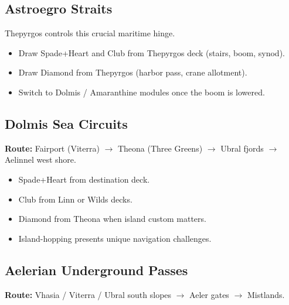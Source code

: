 \subsection{Astroegro Straits}\label{subsec:astroegro_straits}

Thepyrgos controls this crucial maritime hinge.

\begin{itemize}
    \item Draw Spade+Heart and Club from Thepyrgos deck (stairs, boom, synod).
    \item Draw Diamond from Thepyrgos (harbor pass, crane allotment).
    \item Switch to Dolmis / Amaranthine modules once the boom is lowered.
\end{itemize}

\subsection{Dolmis Sea Circuits}\label{subsec:dolmis_circuits}

\textbf{Route:} Fairport (Viterra) $\rightarrow$ Theona (Three Greens) $\rightarrow$ Ubral fjords $\rightarrow$ Aelinnel west shore.

\begin{itemize}
    \item Spade+Heart from destination deck.
    \item Club from Linn or Wilds decks.
    \item Diamond from Theona when island custom matters.
    \item Island-hopping presents unique navigation challenges.
\end{itemize}

\subsection{Aelerian Underground Passes}\label{subsec:aelerian_passes}

\textbf{Route:} Vhasia / Viterra / Ubral south slopes $\rightarrow$ Aeler gates $\rightarrow$ Mistlands.

